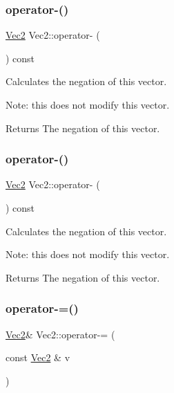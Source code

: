 \subsubsection{\texorpdfstring{operator-\/()}{operator-()}\hspace{0.1cm}{\footnotesize\ttfamily [3/4]}}
{\footnotesize\ttfamily \hyperlink{classVec2}{Vec2} Vec2\+::operator-\/ (\begin{DoxyParamCaption}{ }\end{DoxyParamCaption}) const\hspace{0.3cm}{\ttfamily [inline]}}

Calculates the negation of this vector.

Note\+: this does not modify this vector.

\begin{DoxyReturn}{Returns}
The negation of this vector. 
\end{DoxyReturn}
\mbox{\label{classVec2_ae96b9fc7ac393b36eae80d141d9f8819}} 
\subsubsection{\texorpdfstring{operator-\/()}{operator-()}\hspace{0.1cm}{\footnotesize\ttfamily [4/4]}}
{\footnotesize\ttfamily \hyperlink{classVec2}{Vec2} Vec2\+::operator-\/ (\begin{DoxyParamCaption}{ }\end{DoxyParamCaption}) const\hspace{0.3cm}{\ttfamily [inline]}}

Calculates the negation of this vector.

Note\+: this does not modify this vector.

\begin{DoxyReturn}{Returns}
The negation of this vector. 
\end{DoxyReturn}
\mbox{\label{classVec2_af4a567f4055cde891fa22a17c8a3dccc}} 
\subsubsection{\texorpdfstring{operator-\/=()}{operator-=()}\hspace{0.1cm}{\footnotesize\ttfamily [1/2]}}
{\footnotesize\ttfamily \hyperlink{classVec2}{Vec2}\& Vec2\+::operator-\/= (\begin{DoxyParamCaption}\item[{const \hyperlink{classVec2}{Vec2} \&}]{v }\end{DoxyParamCaption})\hspace{0.3cm}{\ttfamily [inline]}}

